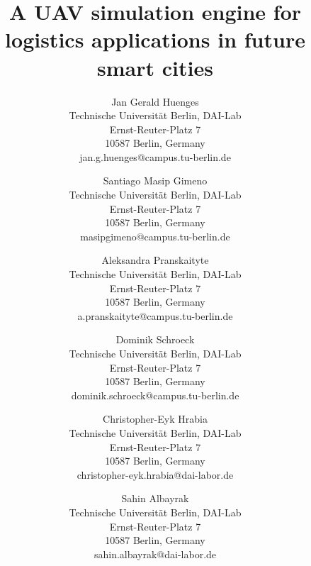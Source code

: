 \documentclass{scspaperproc}
\theoremstyle{scsthe}
\begin{document}
\title{A UAV simulation engine for logistics applications in future smart cities}

\author{Jan Gerald Huenges \\[12pt]
Technische Universität Berlin, DAI-Lab \\
Ernst-Reuter-Platz 7 \\
10587 Berlin, Germany \\
jan.g.huenges@campus.tu-berlin.de \\
\and
Santiago Masip Gimeno \\ [12pt]
Technische Universität Berlin, DAI-Lab \\
Ernst-Reuter-Platz 7 \\
10587 Berlin, Germany \\
masipgimeno@campus.tu-berlin.de \\
\and
Aleksandra Pranskaityte \\ [12pt]
Technische Universität Berlin, DAI-Lab \\
Ernst-Reuter-Platz 7 \\
10587 Berlin, Germany \\
a.pranskaityte@campus.tu-berlin.de \\
\and
Dominik Schroeck \\ [12pt]
Technische Universität Berlin, DAI-Lab \\
Ernst-Reuter-Platz 7 \\
10587 Berlin, Germany \\
dominik.schroeck@campus.tu-berlin.de \\
\and
Christopher-Eyk Hrabia \\ [12pt]
Technische Universität Berlin, DAI-Lab \\
Ernst-Reuter-Platz 7 \\
10587 Berlin, Germany \\
christopher-eyk.hrabia@dai-labor.de \\
\and
Sahin Albayrak\\[12pt]
Technische Universität Berlin, DAI-Lab \\
Ernst-Reuter-Platz 7 \\
10587 Berlin, Germany \\
sahin.albayrak@dai-labor.de
}
\maketitle
\end{document}
